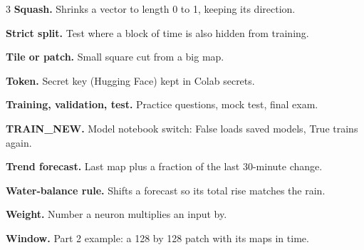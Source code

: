 \begin{multicols}{3}
\textbf{Squash.} Shrinks a vector to length 0 to 1, keeping its direction.\par
\textbf{Strict split.} Test where a block of time is also hidden from training.\par
\textbf{Tile or patch.} Small square cut from a big map.\par
\textbf{Token.} Secret key (Hugging Face) kept in Colab secrets.\par
\textbf{Training, validation, test.} Practice questions, mock test, final exam.\par
\textbf{TRAIN\_NEW.} Model notebook switch: False loads saved models, True trains again.\par
\textbf{Trend forecast.} Last map plus a fraction of the last 30-minute change.\par
\textbf{Water-balance rule.} Shifts a forecast so its total rise matches the rain.\par
\textbf{Weight.} Number a neuron multiplies an input by.\par
\textbf{Window.} Part 2 example: a 128 by 128 patch with its maps in time.\par
\end{multicols}
